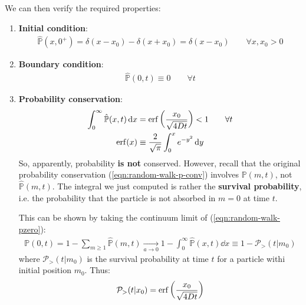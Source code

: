 \documentclass[../../main.tex]{subfiles}
\begin{document}
We can then verify the required properties:
\begin{enumerate}
    \item \textbf{Initial condition}:
    \begin{align*}
        \hat{\mathbb{P}}(x,0^+) = \delta(x-x_0) - \delta(x+x_0) = \delta(x-x_0) \qquad \forall x,x_0 > 0
    \end{align*} 
    \item \textbf{Boundary condition}:
    \begin{align*}
        \hat{\mathbb{P}}(0,t) \equiv 0 \qquad \forall t
    \end{align*} 
    \item \textbf{Probability conservation}:
    \begin{align*}
        \int_0^\infty \hat{\mathbb{P}}(x,t) \dd{x} &= \erf \left(\frac{x_0}{\sqrt{4 D t}} \right) < 1 \qquad \forall t\\
        \erf(x) &\equiv \frac{2}{\sqrt{\pi}} \int_0^x e^{-y^2}\dd{y}
    \end{align*} 
    So, apparently, probability \textbf{is not} conserved. However, recall that the original probability conservation (\ref{eqn:random-walk-p-conv}) involves $\mathbb{P}(m,t)$, not $\hat{\mathbb{P}}(m,t)$. The integral we just computed is rather the \textbf{survival probability}, i.e. the probability that the particle is not absorbed in $m=0$ at time $t$.
    
    This can be shown by taking the continuum limit of (\ref{eqn:random-walk-pzero}):
    \begin{align*}
        \mathbb{P}(0,t) = 1 - \sum_{m \geq 1} \hat{\mathbb{P}}(m,t)  \xrightarrow[a \to 0]{}  1 - \int_0^\infty \hat{\mathbb{P}}(x,t)\dd{x} \equiv 1 - \mathcal{P}_>(t|m_0)
    \end{align*} 
    where $\mathcal{P}_>(t|m_0)$ is the survival probability at time $t$ for a particle withi initial position $m_0$. Thus:
    \begin{align}\label{eqn:random-walk-psurv}
        \mathcal{P}_>(t|x_0) = \erf\left(\frac{x_0}{\sqrt{4 D t}} \right)
    \end{align}


\end{enumerate}
\end{document}

